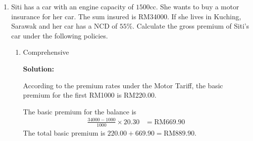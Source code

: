 \documentclass{report}
\newcommand{\sol}{

    \vspace{0.5em}\textbf{Solution:}\vspace{0.5em}}
\begin{document}
\begin{enumerate}
\begin{enumerate}
                    According to the table, the premium rate for Madam Norhafizah is RM6.95. Hence,
                    the annual premium needed to be paid by Madam Norhafizah is
                    $\dfrac{230000}{1000} \times 6.95 = \text{RM} 1 598.50$.

              \item Mr Zaini is 32 years old and a smoker. He wants to buy a life insurance with a
                    coverage of RM65 000 and add on a critical illness policy for 5 years. The
                    critical illness policy offered has a coverage of $40 \%$ of basic face value
                    and the premium rate for every RM1 000 is RM3.75. \sol{}

                    According to the table, the premium rate for Mr Zaini is RM9.50. Hence, the
                    basic premium is $\dfrac{65000}{1000} \times 9.50 = \text{RM} 617.50$.

                    The amount covered by the critical illness policy is $65000 \times 40 \% =
                        \text{RM} 26 000$. Hence, the premium for the critical illness policy is
                    $\dfrac{26000}{1000} \times 3.75 = \text{RM} 97.50$.

                    The total annual premium needed to be paid by Mr Zaini is $617.50 + 97.50 =
                        \text{RM} 715.00$.
          \end{enumerate}
          \vspace{0.5cm}

    \item Siti has a car with an engine capacity of $1500 \mathrm{cc}$. She wants to buy
          a motor insurance for her car. The sum insured is RM34000. If she lives in
          Kuching, Sarawak and her car has a NCD of $55 \%$. Calculate the gross premium
          of Siti's car under the following policies.
          \begin{enumerate}
              \item Comprehensive \sol{}

                    According to the premium rates under the Motor Tariff, the basic premium for
                    the first RM1000 is RM220.00.

                    The basic premium for the balance is
                    \begin{align*}
                        \frac{34000 - 1000}{1000} \times 20.30 & = \text{RM} 669.90
                    \end{align*}
                    The total basic premium is $220.00 + 669.90 = \text{RM} 889.90$.


\end{enumerate}
\end{enumerate}
\end{document}
